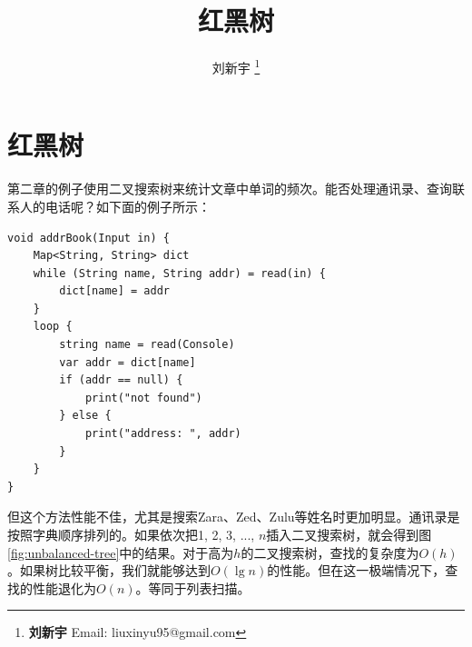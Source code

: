 \documentclass[b5paper]{ctexart}
\begin{document}
\title{红黑树}

\author{刘新宇
\thanks{{\bfseries 刘新宇} \newline
  Email: liuxinyu95@gmail.com \newline}
  }

\maketitle
\fi


\ifx\wholebook\relax
\chapter{红黑树}
\fi

第二章的例子使用二叉搜索树来统计文章中单词的频次。能否处理通讯录、查询联系人的电话呢？如下面的例子所示：

\lstset{frame = single}
\begin{lstlisting}[language=Bourbaki]
void addrBook(Input in) {
    Map<String, String> dict
    while (String name, String addr) = read(in) {
        dict[name] = addr
    }
    loop {
        string name = read(Console)
        var addr = dict[name]
        if (addr == null) {
            print("not found")
        } else {
            print("address: ", addr)
        }
    }
}
\end{lstlisting}

但这个方法性能不佳，尤其是搜索Zara、Zed、Zulu等姓名时更加明显。通讯录是按照字典顺序排列的。如果依次把1, 2, 3, ..., $n$插入二叉搜索树，就会得到图\ref{fig:unbalanced-tree}中的结果。对于高为$h$的二叉搜索树，查找的复杂度为$O(h)$。如果树比较平衡，我们就能够达到$O(\lg n)$的性能。但在这一极端情况下，查找的性能退化为$O(n)$。等同于列表扫描。
\end{document}
